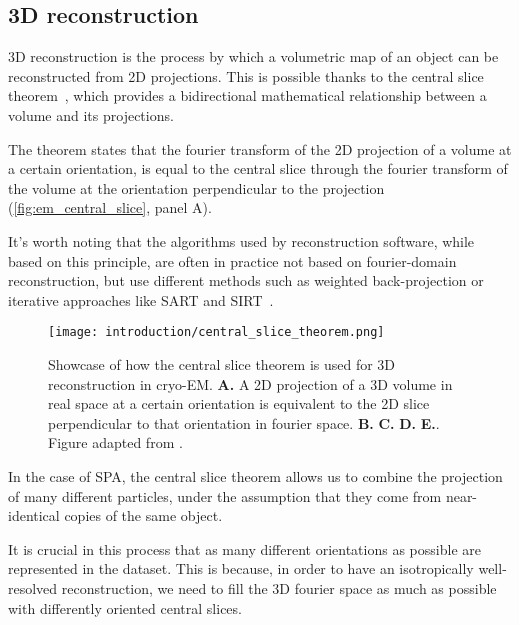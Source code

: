 \subsection{3D reconstruction}\label{em_reconstruction}

3D reconstruction is the process by which a volumetric map of an object can be reconstructed from 2D projections.
This is possible thanks to the central slice theorem~\cite{wikipediaProjectionsliceTheorem2023}, which provides a bidirectional mathematical relationship between a volume and its projections.

The theorem states that the fourier transform of the 2D projection of a volume at a certain orientation, is equal to the central slice through the fourier transform of the volume at the orientation perpendicular to the projection (\autoref{fig:em_central_slice}, panel A).

It's worth noting that the algorithms used by reconstruction software, while based on this principle, are often in practice not based on fourier-domain reconstruction, but use different methods such as weighted back-projection or iterative approaches like SART and SIRT~\cite{andersenSimultaneousAlgebraicReconstruction1984,agulleiroFastTomographicReconstruction2011,wikipediaTomographicReconstruction2024}.

\begin{figure}[ht]
    \centering
    \texttt{[image: introduction/central\_slice\_theorem.png]}
    \caption[Central slice theorem]{Showcase of how the central slice theorem is used for 3D reconstruction in cryo-EM. \textbf{A.} A 2D projection of a 3D volume in real space at a certain orientation is equivalent to the 2D slice perpendicular to that orientation in fourier space. \textbf{B.} \textbf{C.} \textbf{D.} \textbf{E.}. Figure adapted from \citet{nogalesCryoEMUniqueTool2015}.}
    \label{fig:em_central_slice}
\end{figure}

In the case of SPA, the central slice theorem allows us to combine the projection of many different particles, under the assumption that they come from near-identical copies of the same object.

It is crucial in this process that as many different orientations as possible are represented in the dataset.
This is because, in order to have an isotropically well-resolved reconstruction, we need to fill the 3D fourier space as much as possible with differently oriented central slices.

